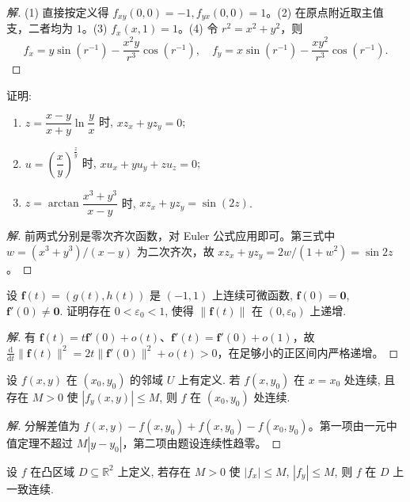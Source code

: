 \documentclass[../../数学分析培优讲义(答案版).tex]{subfiles}
\begin{document}
\begin{proof}[解]
(1) 直接按定义得 $f_{xy}(0,0)=-1,f_{yx}(0,0)=1$。(2) 在原点附近取主值支，二者均为 $1$。(3) $f_x(x,1)=1$。(4) 令 $r^2=x^2+y^2$，则
\[
f_x=y\sin(r^{-1})-\dfrac{x^2y}{r^3}\cos(r^{-1}),\quad
f_y=x\sin(r^{-1})-\dfrac{xy^2}{r^3}\cos(r^{-1}).
\]
\end{proof}

\begin{example}
证明:
\begin{enumerate}[label=(\arabic*)]
    \item $\displaystyle z=\dfrac{x-y}{x+y}\ln\dfrac{y}{x}$ 时, $xz_x+yz_y=0$;
    \item $\displaystyle u=\left(\dfrac{x}{y}\right)^{\frac{z}{y}}$ 时, $xu_x+yu_y+zu_z=0$;
    \item $\displaystyle z=\arctan\dfrac{x^3+y^3}{x-y}$ 时, $xz_x+yz_y=\sin(2z)$.
\end{enumerate}
\end{example}

\begin{proof}[解]
前两式分别是零次齐次函数，对 Euler 公式应用即可。第三式中 $w=(x^3+y^3)/(x-y)$ 为二次齐次，故 $xz_x+yz_y=2w/(1+w^2)=\sin2z$。
\end{proof}

\begin{example}
设 $\bm f(t)=(g(t),h(t))$ 是 $(-1,1)$ 上连续可微函数, $\bm f(0)=\bm{0}$, $\bm f'(0)\ne\bm{0}$. 证明存在 $0<\varepsilon_0<1$, 使得 $\|\bm f(t)\|$ 在 $(0,\varepsilon_0)$ 上递增.
\end{example}

\begin{proof}[解]
有 $\bm f(t)=t\bm f'(0)+o(t)$、$\bm f'(t)=\bm f'(0)+o(1)$，故
$\frac{\mathrm d}{\mathrm dt}\|\bm f(t)\|^2=2t\|\bm f'(0)\|^2+o(t)>0$，在足够小的正区间内严格递增。
\end{proof}

\begin{example}
设 $f(x,y)$ 在 $(x_0,y_0)$ 的邻域 $U$ 上有定义. 若 $f(x,y_0)$ 在 $x=x_0$ 处连续, 且存在 $M>0$ 使 $|f_y(x,y)|\leq M$, 则 $f$ 在 $(x_0,y_0)$ 处连续.
\end{example}

\begin{proof}[解]
分解差值为 $f(x,y)-f(x,y_0)+f(x,y_0)-f(x_0,y_0)$。第一项由一元中值定理不超过 $M|y-y_0|$，第二项由题设连续性趋零。
\end{proof}

\begin{example}
设 $f$ 在凸区域 $D\subseteq\mathbb{R}^2$ 上定义, 若存在 $M>0$ 使 $|f_x|\leq M$, $|f_y|\leq M$, 则 $f$ 在 $D$ 上一致连续.
\end{example}
\end{document}
